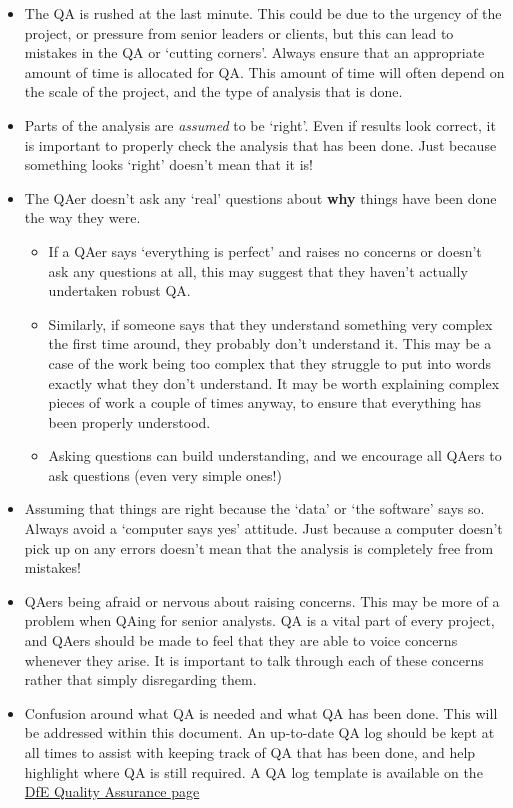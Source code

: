 \documentclass[
]{article}
\providecommand{\tightlist}{%
  \setlength{\itemsep}{0pt}\setlength{\parskip}{0pt}}
\begin{document}
\begin{itemize}
\item
  The QA is rushed at the last minute. This could be due to the urgency of the project, or pressure from senior leaders or clients, but this can lead to mistakes in the QA or `cutting corners'. Always ensure that an appropriate amount of time is allocated for QA. This amount of time will often depend on the scale of the project, and the type of analysis that is done.
\item
  Parts of the analysis are \emph{assumed} to be `right'. Even if results look correct, it is important to properly check the analysis that has been done. Just because something looks `right' doesn't mean that it is!
\item
  The QAer doesn't ask any `real' questions about \textbf{why} things have been done the way they were.

  \begin{itemize}
  \tightlist
  \item
    If a QAer says `everything is perfect' and raises no concerns or doesn't ask any questions at all, this may suggest that they haven't actually undertaken robust QA.
  \item
    Similarly, if someone says that they understand something very complex the first time around, they probably don't understand it. This may be a case of the work being too complex that they struggle to put into words exactly what they don't understand. It may be worth explaining complex pieces of work a couple of times anyway, to ensure that everything has been properly understood.
  \item
    Asking questions can build understanding, and we encourage all QAers to ask questions (even very simple ones!)
  \end{itemize}
\item
  Assuming that things are right because the `data' or `the software' says so. Always avoid a `computer says yes' attitude. Just because a computer doesn't pick up on any errors doesn't mean that the analysis is completely free from mistakes!
\item
  QAers being afraid or nervous about raising concerns. This may be more of a problem when QAing for senior analysts. QA is a vital part of every project, and QAers should be made to feel that they are able to voice concerns whenever they arise. It is important to talk through each of these concerns rather that simply disregarding them.
\item
  Confusion around what QA is needed and what QA has been done. This will be addressed within this document. An up-to-date QA log should be kept at all times to assist with keeping track of QA that has been done, and help highlight where QA is still required. A QA log template is available on the \href{https://educationgovuk.sharepoint.com/sites/sarpi/g/SitePages/Quality-Assurance.aspx}{DfE Quality Assurance page}
\end{itemize}
\end{document}
